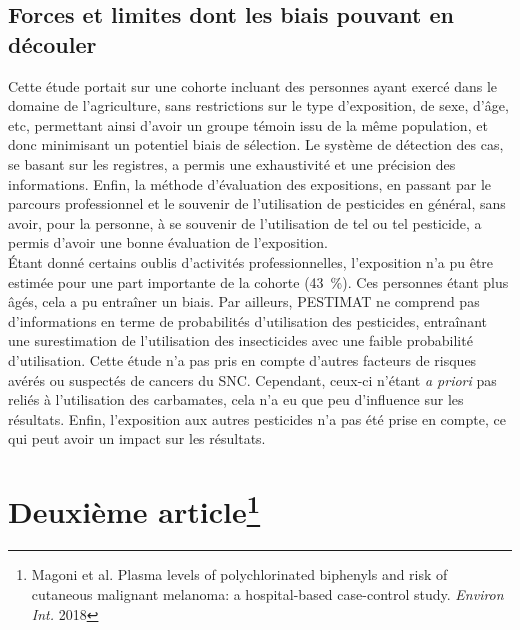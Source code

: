\documentclass[10pt]{article}
\begin{document}
\subsection{Forces et limites dont les biais pouvant en découler}
Cette étude portait sur une cohorte incluant des personnes ayant exercé dans le domaine de l'agriculture, sans restrictions sur le type d'exposition, de sexe, d'âge, etc, permettant ainsi d'avoir un groupe témoin issu de la même population, et donc minimisant un potentiel biais de sélection. Le système de détection des cas, se basant sur les registres, a permis une exhaustivité et une précision des informations. Enfin, la méthode d'évaluation des expositions, en passant par le parcours professionnel et le souvenir de l'utilisation de pesticides en général, sans avoir, pour la personne, à se souvenir de l'utilisation de tel ou tel pesticide, a permis d'avoir une bonne évaluation de l'exposition.\\

\'{E}tant donné certains oublis d'activités professionnelles, l'exposition n'a pu être estimée pour une part importante de la cohorte (43~\%). Ces personnes étant plus âgés, cela a pu entraîner un biais. Par ailleurs, PESTIMAT ne comprend pas d'informations en terme de probabilités d'utilisation des pesticides, entraînant une surestimation de l'utilisation des insecticides avec une faible probabilité d'utilisation. Cette étude n'a pas pris en compte d'autres facteurs de risques avérés ou suspectés de cancers du SNC. Cependant, ceux-ci n'étant \emph{a priori} pas reliés à l'utilisation des carbamates, cela n'a eu que peu d'influence sur les résultats. Enfin, l'exposition aux autres pesticides n'a pas été prise en compte, ce qui peut avoir un impact sur les résultats. 

\newpage

\section{Deuxième article\protect\footnote{Magoni et al. Plasma levels of polychlorinated biphenyls and risk of cutaneous malignant melanoma: a hospital-based case-control study. \emph{Environ Int.} 2018}}
\end{document}
